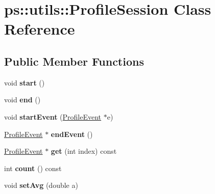 \hypertarget{classps_1_1utils_1_1ProfileSession}{}\section{ps\+:\+:utils\+:\+:Profile\+Session Class Reference}
\label{classps_1_1utils_1_1ProfileSession}
\subsection*{Public Member Functions}
\begin{DoxyCompactItemize}
\item 
\hypertarget{classps_1_1utils_1_1ProfileSession_a352ebb574dffa5e5d03dffd34c474a76}{}void {\bfseries start} ()\label{classps_1_1utils_1_1ProfileSession_a352ebb574dffa5e5d03dffd34c474a76}

\item 
\hypertarget{classps_1_1utils_1_1ProfileSession_abda04c2be6689dbaebe21acad4c773ba}{}void {\bfseries end} ()\label{classps_1_1utils_1_1ProfileSession_abda04c2be6689dbaebe21acad4c773ba}

\item 
\hypertarget{classps_1_1utils_1_1ProfileSession_aee1208eb36bc011cba846e98a5bba8ff}{}void {\bfseries start\+Event} (\hyperlink{classps_1_1utils_1_1ProfileEvent}{Profile\+Event} $\ast$e)\label{classps_1_1utils_1_1ProfileSession_aee1208eb36bc011cba846e98a5bba8ff}

\item 
\hypertarget{classps_1_1utils_1_1ProfileSession_a5720c1537eb6b1428a3f921dcc79af7c}{}\hyperlink{classps_1_1utils_1_1ProfileEvent}{Profile\+Event} $\ast$ {\bfseries end\+Event} ()\label{classps_1_1utils_1_1ProfileSession_a5720c1537eb6b1428a3f921dcc79af7c}

\item 
\hypertarget{classps_1_1utils_1_1ProfileSession_abbe00de03a0c152416054f1eb61af395}{}\hyperlink{classps_1_1utils_1_1ProfileEvent}{Profile\+Event} $\ast$ {\bfseries get} (int index) const \label{classps_1_1utils_1_1ProfileSession_abbe00de03a0c152416054f1eb61af395}

\item 
\hypertarget{classps_1_1utils_1_1ProfileSession_a57ad88985ec7044907dfb79825d5200d}{}int {\bfseries count} () const \label{classps_1_1utils_1_1ProfileSession_a57ad88985ec7044907dfb79825d5200d}

\item 
\hypertarget{classps_1_1utils_1_1ProfileSession_a2374fe121d0782bb03cb3f6bf2675768}{}void {\bfseries set\+Avg} (double a)\label{classps_1_1utils_1_1ProfileSession_a2374fe121d0782bb03cb3f6bf2675768}


\end{DoxyCompactItemize}

